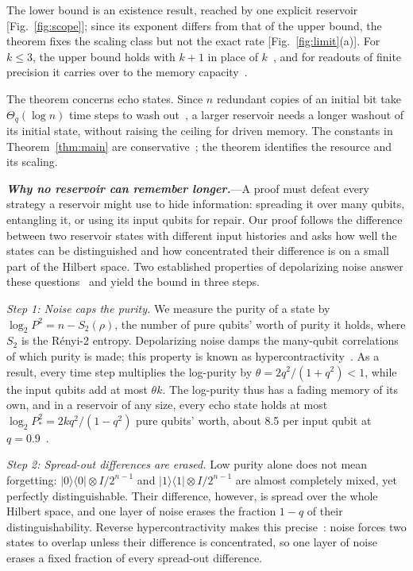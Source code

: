 \documentclass[aps,prl,twocolumn,superscriptaddress,floatfix]{revtex4-2}
\theoremstyle{plain}
\newcommand{\ketbra}[2]{|#1\rangle\!\langle #2|}
\newcommand{\runin}[1]{\textit{\textbf{#1}}---}
\begin{document}
The lower bound is an existence result, reached by one explicit reservoir [Fig.~\ref{fig:scope}]; since its exponent differs from that of the upper bound, the theorem fixes the scaling class but not the exact rate [Fig.~\ref{fig:limit}(a)]. For $k\le3$, the upper bound holds with $k+1$ in place of $k$~\cite{SM}, and for readouts of finite precision it carries over to the memory capacity~\cite{Jaeger2002,SM}.

The theorem concerns echo states. Since $n$ redundant copies of an initial bit take $\Theta_q(\log n)$ time steps to wash out~\cite{SM}, a larger reservoir needs a longer washout of its initial state, without raising the ceiling for driven memory. The constants in Theorem~\ref{thm:main} are conservative~\cite{SM}; the theorem identifies the resource and its scaling.

\runin{Why no reservoir can remember longer.}A proof must defeat every strategy a reservoir might use to hide information: spreading it over many qubits, entangling it, or using its input qubits for repair. Our proof follows the difference between two reservoir states with different input histories and asks how well the states can be distinguished and how concentrated their difference is on a small part of the Hilbert space. Two established properties of depolarizing noise answer these questions~\cite{King2014,Cubitt2015} and yield the bound in three steps.

\emph{Step 1: Noise caps the purity.} We measure the purity of a state by $\log_2P^2=n-S_2(\rho)$, the number of pure qubits' worth of purity it holds, where $S_2$ is the R\'enyi-2 entropy. Depolarizing noise damps the many-qubit correlations of which purity is made; this property is known as hypercontractivity~\cite{King2014}. As a result, every time step multiplies the log-purity by $\theta=2q^2/(1+q^2)<1$, while the input qubits add at most $\theta k$. The log-purity thus has a fading memory of its own, and in a reservoir of any size, every echo state holds at most $\log_2P_*^2=2kq^2/(1-q^2)$ pure qubits' worth, about 8.5 per input qubit at $q=0.9$~\cite{SM}.

\emph{Step 2: Spread-out differences are erased.} Low purity alone does not mean forgetting: $\ketbra00\otimes I/2^{n-1}$ and $\ketbra11\otimes I/2^{n-1}$ are almost completely mixed, yet perfectly distinguishable. Their difference, however, is spread over the whole Hilbert space, and one layer of noise erases the fraction $1-q$ of their distinguishability. Reverse hypercontractivity makes this precise~\cite{Cubitt2015}: noise forces two states to overlap unless their difference is concentrated, so one layer of noise erases a fixed fraction of every spread-out difference.
\end{document}
